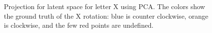   \begin{figure}[htbp!]
      \centering
      \caption{Projection for latent space for letter X using PCA. The colors show the ground truth of the X rotation: blue is counter clockwise, orange is clockwise, and the few red points are undefined.}
      \label{fig:x_bottleneck}
  \end{figure}

